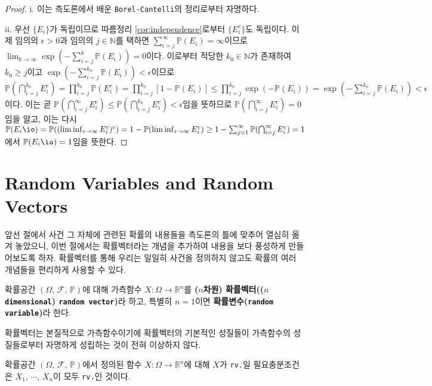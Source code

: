 \begin{proof}
    i. 이는 측도론에서 배운 \texttt{Borel-Cantelli}의 정리로부터 자명하다.

    ii. 우선 $\{E_i\}$가 독립이므로 따름정리 \ref{cor:independence}로부터 $\{E_i^c\}$도 독립이다. 이제 임의의 $\epsilon>0$과 임의의 $j\in\mathbb{N}$를 택하면 $\sum_{i=j}^\infty\mathbb{P}(E_i)=\infty$이므로 $\lim_{k\to\infty}\exp(-\sum_{i=j}^k\mathbb{P}(E_i))=0$이다. 이로부터 적당한 $k_0\in\mathbb{N}$가 존재하여 $k_0\geq j$이고 $\exp(-\sum_{i=j}^{k_0}\mathbb{P}(E_i))<\epsilon$이므로 $\mathbb{P}(\bigcap_{i=j}^{k_0}E_i^c)=\prod_{i=j}^{k_0}\mathbb{P}(E_i^c)=\prod_{i=j}^{k_0}[1-\mathbb{P}(E_i)]\leq\prod_{i=j}^{k_0}\exp(-\mathbb{P}(E_i))=\exp(-\sum_{i=j}^{k_0}\mathbb{P}(E_i))<\epsilon$이다. 이는 곧 $\mathbb{P}(\bigcap_{i=j}^\infty E_i^c)\leq\mathbb{P}(\bigcap_{i=j}^{k_0}E_i^c)<\epsilon$임을 뜻하므로 $\mathbb{P}(\bigcap_{i=j}^\infty E_i^c)=0$임을 알고, 이는 다시 $\mathbb{P}(E_i\io)=\mathbb{P}((\liminf_{i\to\infty} E_i^c)^c)=1-\mathbb{P}(\liminf_{i\to\infty} E_i^c)\geq1-\sum_{j=1}^\infty\mathbb{P}(\bigcap_{i=j}^\infty E_i^c)=1$에서 $\mathbb{P}(E_i\io)=1$임을 뜻한다.
\end{proof}

\section{Random Variables and Random Vectors}

앞선 절에서 사건 그 자체에 관련된 확률의 내용들을 측도론의 틀에 맞추어 열심히 옮겨 놓았으니, 이번 절에서는 확률벡터라는 개념을 추가하여 내용을 보다 풍성하게 만들어보도록 하자. 확률벡터를 통해 우리는 일일히 사건을 정의하지 않고도 확률의 여러 개념들을 편리하게 사용할 수 있다.

\begin{definition}
    확률공간 $(\Omega,\,\mathcal{F},\,\mathbb{P})$에 대해 가측함수 $X:\Omega\to\mathbb{R}^n$를 \textbf{($n$차원) 확률벡터(($n$ \texttt{dimensional}) \texttt{random vector})}라 하고, 특별히 $n=1$이면 \textbf{확률변수(\texttt{random variable})}라 한다.
\end{definition}

확률벡터는 본질적으로 가측함수이기에 확률벡터의 기본적인 성질들이 가측함수의 성질들로부터 자명하게 성립하는 것이 전혀 이상하지 않다.

\begin{proposition}
    확률공간 $(\Omega,\,\mathcal{F},\,\mathbb{P})$에서 정의된 함수 $X:\Omega\to\mathbb{R}^n$에 대해 $X$가 \texttt{rv.}일 필요충분조건은 $X_1,\,\cdots,\,X_n$이 모두 \texttt{rv.}인 것이다.
\end{proposition}

